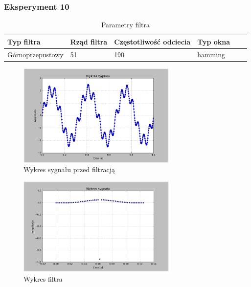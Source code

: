 \documentclass{article}
\begin{document}
{        \subsubsection{Eksperyment 10} {
            \begin{table}[h!]
            \centering
            \begin{tabular}{|l|l|l|l|l|l|}
            \hline
            Typ filtra & Rząd filtra & Częstotliwość odciecia & Typ okna  \\\hline
            Górnoprzepustowy & 51 & 190 & hamming     \\\hline
            \end{tabular}
            \caption{Parametry filtra}
            \end{table}
            \begin{figure}[h!]
                \centering
                \includegraphics[width=0.7\textwidth]{img/sig.png}
                \caption{Wykres sygnału przed filtracją}
            \end{figure}
            \begin{figure}[h!]
                \centering
                \includegraphics[width=0.7\textwidth]{img/fil19.png}
                \caption{Wykres filtra}
            \end{figure}

}}
\end{document}
